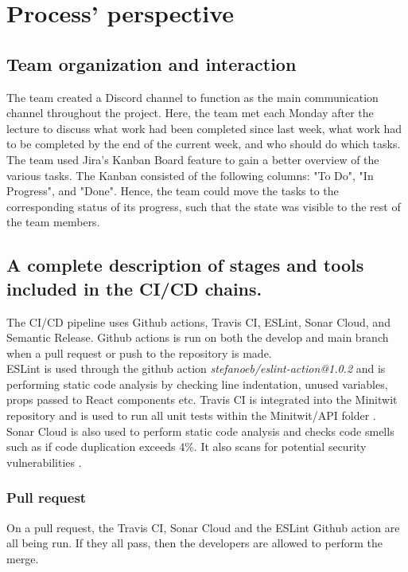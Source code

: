 \section{Process' perspective}

\subsection{Team organization and interaction}
The team created a Discord channel to function as the main communication channel throughout the project. Here, the team met each Monday after the lecture to discuss what work had been completed since last week, what work had to be completed by the end of the current week, and who should do which tasks. \\
The team used Jira's Kanban Board feature\cite{jira} to gain a better overview of the various tasks. The Kanban consisted of the following columns: "To Do", "In Progress", and "Done". Hence, the team could move the tasks to the corresponding status of its progress, such that the state was visible to the rest of the team members.

\subsection{A complete description of stages and tools included in the CI/CD chains.}
The CI/CD pipeline uses Github actions, Travis CI, ESLint, Sonar Cloud, and Semantic Release. Github actions is run on both the develop and main branch when a pull request or push to the repository is made. \\

ESLint is used through the github action \textit{stefanoeb/eslint-action@1.0.2} \cite{eslint-action} and is performing static code analysis by checking line indentation, unused variables, props passed to React components etc. Travis CI is integrated into the Minitwit repository and is used to run all unit tests within the Minitwit/API folder \cite{travis-ci}. Sonar Cloud is also used to perform static code analysis and checks code smells such as if code duplication exceeds 4\%. It also scans for potential security vulnerabilities \cite{sonarcloud}.

\subsubsection{Pull request}
On a pull request, the Travis CI, Sonar Cloud and the ESLint Github action are all being run. If they all pass, then the developers are allowed to perform the merge.

